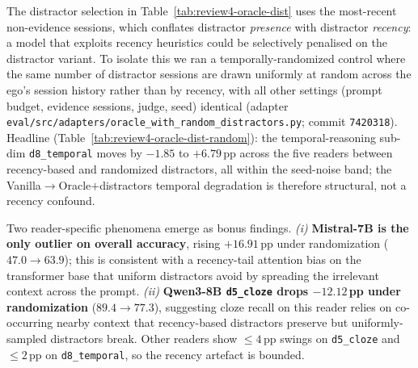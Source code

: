 The distractor selection in Table~\ref{tab:review4-oracle-dist} uses the most-recent non-evidence sessions, which conflates distractor \emph{presence} with distractor \emph{recency}: a model that exploits recency heuristics could be selectively penalised on the distractor variant. To isolate this we ran a temporally-randomized control where the same number of distractor sessions are drawn uniformly at random across the ego's session history rather than by recency, with all other settings (prompt budget, evidence sessions, judge, seed) identical (adapter \texttt{eval/src/adapters/oracle\_with\_random\_distractors.py}; commit \texttt{7420318}). Headline (Table~\ref{tab:review4-oracle-dist-random}): the temporal-reasoning sub-dim \texttt{d8\_temporal} moves by $-1.85$ to $+6.79$\,pp across the five readers between recency-based and randomized distractors, all within the seed-noise band; the Vanilla$\to$Oracle$+$distractors temporal degradation is therefore structural, not a recency confound.

Two reader-specific phenomena emerge as bonus findings. \emph{(i)} \textbf{Mistral-7B is the only outlier on overall accuracy}, rising $+16.91$\,pp under randomization ($47.0 \to 63.9$); this is consistent with a recency-tail attention bias on the transformer base that uniform distractors avoid by spreading the irrelevant context across the prompt. \emph{(ii)} \textbf{Qwen3-8B \texttt{d5\_cloze} drops $-12.12$\,pp under randomization} ($89.4 \to 77.3$), suggesting cloze recall on this reader relies on co-occurring nearby context that recency-based distractors preserve but uniformly-sampled distractors break. Other readers show $\leq 4$\,pp swings on \texttt{d5\_cloze} and $\leq 2$\,pp on \texttt{d8\_temporal}, so the recency artefact is bounded.

